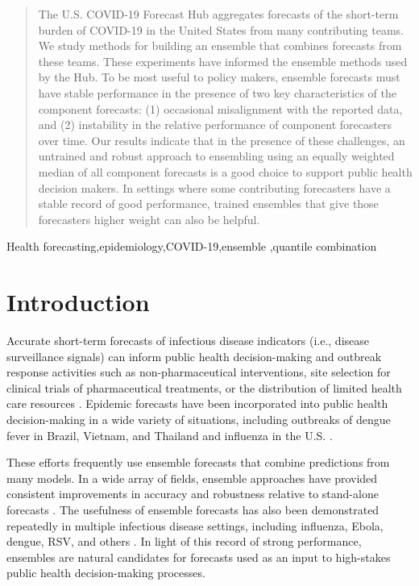 \documentclass[11pt,3p,authoryear]{elsarticle}
\begin{document}
\begin{frontmatter}
\begin{abstract}
The U.S. COVID-19 Forecast Hub aggregates forecasts of the short-term burden of
COVID-19 in the United States from many contributing teams. We study methods for
building an ensemble that combines forecasts from these teams. These experiments
have informed the ensemble methods used by the Hub. To be most useful to policy
makers, ensemble forecasts must have stable performance in the presence of two
key characteristics of the component forecasts: (1) occasional misalignment with
the reported data, and (2) instability in the relative performance of component
forecasters over time. Our results indicate that in the presence of these
challenges, an untrained and robust approach to ensembling using an equally
weighted median of all component forecasts is a good choice to support public
health decision makers. In settings where some contributing forecasters have a
stable record of good performance, trained ensembles that give those forecasters
higher weight can also be helpful.
\end{abstract}

\begin{keyword}
Health forecasting\sep epidemiology\sep COVID-19\sep ensemble \sep quantile combination
\end{keyword}

\end{frontmatter}

\section{Introduction}

Accurate short-term forecasts of infectious disease indicators (i.e., disease surveillance signals) can inform public health decision-making and outbreak response activities such as non-pharmaceutical interventions, site selection for clinical trials of pharmaceutical treatments, or the distribution of limited health care resources \citep{wallinga_optimizing_2010, lipsitch_improving_2011, dean_ensemble_2020}.
Epidemic forecasts have been incorporated into public health decision-making in a wide variety of situations, including outbreaks of dengue fever in Brazil, Vietnam, and Thailand \citep{Rlowe2016,colon-gonzalez_probabilistic_2021,reich_challenges_2016} and
influenza in the U.S. \citep{mcgowan_collaborative_2019}.

These efforts frequently use ensemble forecasts that combine predictions from many models.
In a wide array of fields, ensemble approaches have provided consistent improvements in accuracy and robustness relative to stand-alone forecasts \citep{gneiting_weather_2005, polikar_ensemble_2006}.
The usefulness of ensemble forecasts has also been demonstrated repeatedly in multiple infectious disease settings, including influenza, Ebola, dengue, RSV, and others \citep{yamana_superensemble_2016, viboud_rapidd_2018, mcgowan_collaborative_2019, johansson_open_2019, reis_superensemble_2019, reich_accuracy_2019}.
In light of this record of strong performance, ensembles are natural candidates for forecasts used as an input to high-stakes public health decision-making processes.
\end{document}
